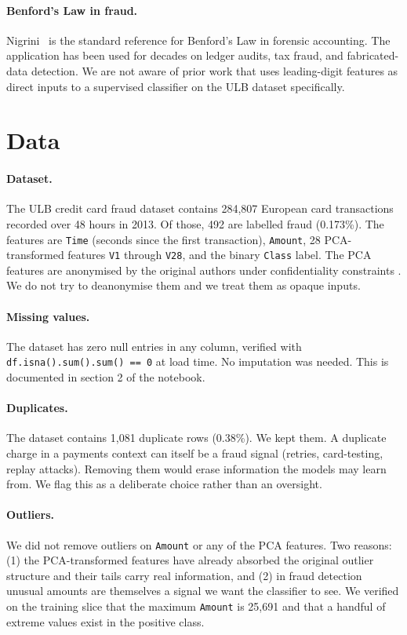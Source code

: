 \documentclass{article}
\begin{document}
\paragraph{Benford's Law in fraud.} Nigrini~\cite{nigrini2012} is the standard reference for Benford's Law in forensic accounting. The application has been used for decades on ledger audits, tax fraud, and fabricated-data detection. We are not aware of prior work that uses leading-digit features as direct inputs to a supervised classifier on the ULB dataset specifically.

\section{Data}

\paragraph{Dataset.} The ULB credit card fraud dataset contains 284{,}807 European card transactions recorded over 48 hours in 2013. Of those, 492 are labelled fraud (0.173\%). The features are \texttt{Time} (seconds since the first transaction), \texttt{Amount}, 28 PCA-transformed features \texttt{V1} through \texttt{V28}, and the binary \texttt{Class} label. The PCA features are anonymised by the original authors under confidentiality constraints \cite{dalpozzolo2018}. We do not try to deanonymise them and we treat them as opaque inputs.

\paragraph{Missing values.} The dataset has zero null entries in any column, verified with \texttt{df.isna().sum().sum() == 0} at load time. No imputation was needed. This is documented in section 2 of the notebook.

\paragraph{Duplicates.} The dataset contains 1{,}081 duplicate rows (0.38\%). We kept them. A duplicate charge in a payments context can itself be a fraud signal (retries, card-testing, replay attacks). Removing them would erase information the models may learn from. We flag this as a deliberate choice rather than an oversight.

\paragraph{Outliers.} We did not remove outliers on \texttt{Amount} or any of the PCA features. Two reasons: (1) the PCA-transformed features have already absorbed the original outlier structure and their tails carry real information, and (2) in fraud detection unusual amounts are themselves a signal we want the classifier to see. We verified on the training slice that the maximum \texttt{Amount} is 25{,}691 and that a handful of extreme values exist in the positive class.
\end{document}

